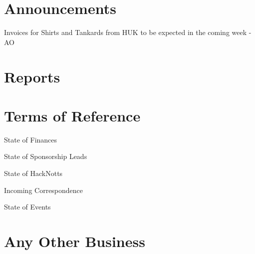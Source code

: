 \documentclass[11pt,hacksoc,agenda]{meetingmins}
\begin{document}
\maketitle

\section{Announcements}
\begin{items}
\item Invoices for Shirts and Tankards from HUK to be expected in the coming week - AO
\end{items}

\section{Reports}

\section{Terms of Reference}
\begin{items}
\item {State of Finances}
\item {State of Sponsorship Leads}
\item {State of HackNotts}
\item {Incoming Correspondence}
\item {State of Events}
\end{items}

\section{Any Other Business}

\vspace{1em}
\end{document}
